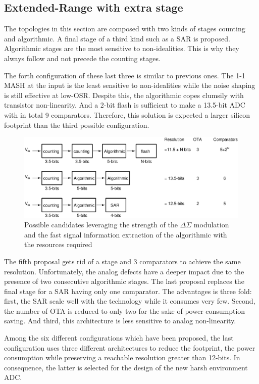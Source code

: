 \subsection{Extended-Range with extra stage}
The topologies in this section are composed with two kinds of stages counting and algorithmic. A final stage of a third kind such as a SAR is proposed. Algorithmic stages are the most sensitive to non-idealities. This is why they always follow and not precede the counting stages.

The forth configuration of these last three is similar to previous ones. The 1-1 MASH at the input is the least sensitive to non-idealities while the noise shaping is still effective at low-OSR\@. Despite this, the algorithmic copes clumsily with transistor non-linearity. And a 2-bit flash is sufficient to make a 13.5-bit ADC with in total 9 comparators. Therefore, this solution is expected a larger silicon footprint than the third possible configuration.

\begin{figure}[htp]
	\centering
	\includegraphics[width=.9\textwidth]{Chapter4/Figs/study/counting-algo-conversion.ps}
	\caption{Possible candidates leveraging the strength of the \(\Delta \Sigma\) modulation and the fast signal information extraction of the algorithmic with the resources required }
	\label{fig:counting-algo-candidates}
\end{figure}

The fifth proposal gets rid of a stage and 3 comparators to achieve the same resolution. Unfortunately, the analog defects have a deeper impact due to the presence of two consecutive algorithmic stages. The last proposal replaces the final stage for a SAR having only one comparator. The advantages is three fold: first, the SAR scale well with the technology while it consumes very few. Second, the number of OTA is reduced to only two for the sake of power consumption saving. And third, this architecture is less sensitive to analog non-linearity.

Among the six different configurations which have been proposed, the last configuration uses three different architectures to reduce the footprint, the power consumption while preserving a reachable resolution greater than 12-bits. In consequence, the latter is selected for the design of the new harsh environment ADC\@.

